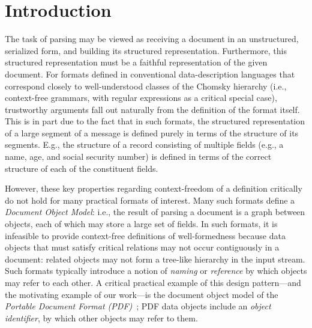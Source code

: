 \section{Introduction }
\label{sec:intro}
The task of parsing may be viewed as receiving a document in an
unstructured, serialized form, and building its structured
representation. Furthermore, this structured representation must be a
faithful representation of the given document.
%
For formats defined in conventional data-description languages that
correspond closely to well-understood classes of the Chomsky hierarchy
(i.e., context-free grammars, with regular expressions as a critical
special case), trustworthy arguments fall out naturally from the
definition of the format itself.
%
This is in part due to the fact that in such formats, the structured
representation of a large segment of a message is defined purely in
terms of the structure of its segments.
%
E.g., the structure of a record consisting of multiple fields (e.g., a
name, age, and social security number) is defined in terms of the
correct structure of each of the constituent fields.

However, these key properties regarding context-freedom of a
definition critically do not hold for many practical formats of
interest.
%
Many such formats define a \emph{Document Object Model}: i.e., the
result of parsing a document is a graph between objects, each
of which may store a large set of fields.
%
In such formats, it is infeasible to provide context-free definitions
of well-formedness because data objects that must satisfy critical
relations may not occur contiguously in a document: related objects
may not form a tree-like hierarchy in the input stream.
%
Such formats typically introduce a notion of \emph{naming} or
\emph{reference} by which objects may refer to each other.
%
A critical practical example of this design pattern---and the
motivating example of our work---is the document object model of the
\emph{Portable Document Format (PDF)}~\cite{isotc171sc2wg8ISO32000220202020};
%
PDF data objects include an \emph{object identifier}, by which other
objects may refer to them.

